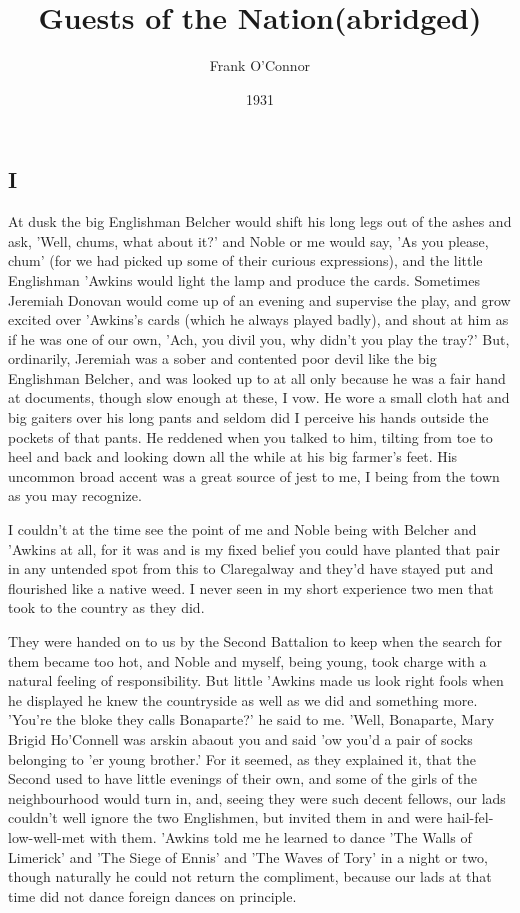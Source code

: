 \documentclass[10pt,a4paper]{article}
\newcommand{\subtitle}[1]{\vspace{10pt}\newline\normalsize\plantin #1}
\begin{document}
\title{Guests of the Nation\subtitle{(abridged)}}
\date{1931}
\author{Frank O'Connor}
\maketitle
    
\thispagestyle{plain}
\setcounter{page}{1}
\linenumbers
\subsection{I}
At dusk the big Englishman Belcher would shift his long legs out of the ashes and ask, 'Well, chums, what about it?' and Noble or me would say, 'As you please, chum' (for we had picked up some of their curious expressions), and the little Englishman 'Awkins would light the lamp and produce the cards. Sometimes Jeremiah Donovan would come up of an evening and supervise the play, and grow excited over 'Awkins's cards (which he always played badly), and shout at him as if he was one of our own, 'Ach, you divil you, why didn't you play the tray?' But, ordinarily, Jeremiah was a sober and contented poor devil like the big Englishman Belcher, and was looked up to at all only because he was a fair hand at documents, though slow enough at these, I vow. He wore a small cloth hat and big gaiters over his long pants and seldom did I perceive his hands outside the pockets of that pants. He reddened when you talked to him, tilting from toe to heel and back and looking down all the while at his big farmer's feet. His uncommon broad accent was a great source of jest to me, I being from the town as you may recognize. 

I couldn't at the time see the point of me and Noble being with Belcher and 'Awkins at all, for it was and is my fixed belief you could have planted that pair in any untended spot from this to Claregalway and they'd have stayed put and flourished like a native weed. I never seen in my short experience two men that took to the country as they did. 

They were handed on to us by the Second Battalion to keep when the search for them became too hot, and Noble and myself, being young, took charge with a natural feeling of responsibility. But little 'Awkins made us look right fools when he displayed he knew the countryside as well as we did and something more. 'You're the bloke they calls Bonaparte?' he said to me. 'Well, Bonaparte, Mary Brigid Ho'Connell was arskin abaout you and said 'ow you'd a pair of socks belonging to 'er young brother.' For it seemed, as they explained it, that the Second used to have little evenings of their own, and some of the girls of the neighbourhood would turn in, and, seeing they were such decent fellows, our lads couldn't well ignore the two Englishmen, but invited them in and were hail-fel- low-well-met with them. 'Awkins told me he learned to dance 'The Walls of Limerick' and 'The Siege of Ennis' and 'The Waves of Tory' in a night or two, though naturally he could not return the compliment, because our lads at that time did not dance foreign dances on principle. 
\end{document}
